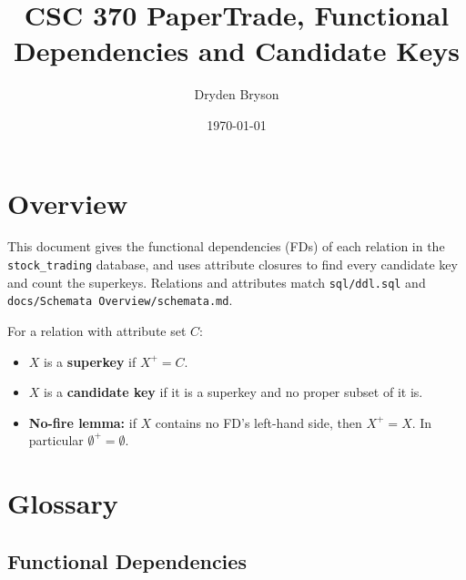 \documentclass{article}
\title{CSC 370 PaperTrade, Functional Dependencies and Candidate Keys}
\author{Dryden Bryson}
\date{\today}
\begin{document}
\maketitle
\newpage

\section*{Overview}

This document gives the functional dependencies (FDs) of each relation in the \texttt{stock\_trading} database, and uses attribute closures to find every candidate key and count the superkeys. Relations and attributes match \texttt{sql/ddl.sql} and \texttt{docs/Schemata Overview/schemata.md}.

For a relation with attribute set $C$:
\begin{itemize}[nosep]
  \item $X$ is a \textbf{superkey} if $X^+ = C$.
  \item $X$ is a \textbf{candidate key} if it is a superkey and no proper subset of it is.
  \item \textbf{No-fire lemma:} if $X$ contains no FD's left-hand side, then $X^+ = X$. In particular $\emptyset^+ = \emptyset$.
\end{itemize}

\section*{Glossary}

\subsection*{Functional Dependencies}
\end{document}
